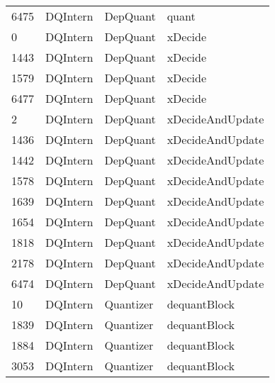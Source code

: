 \begin{tabular}{llll}
6475 &              DQIntern &                   DepQuant &                                     quant \\
0    &              DQIntern &                   DepQuant &                                   xDecide \\
1443 &              DQIntern &                   DepQuant &                                   xDecide \\
1579 &              DQIntern &                   DepQuant &                                   xDecide \\
6477 &              DQIntern &                   DepQuant &                                   xDecide \\
2    &              DQIntern &                   DepQuant &                          xDecideAndUpdate \\
1436 &              DQIntern &                   DepQuant &                          xDecideAndUpdate \\
1442 &              DQIntern &                   DepQuant &                          xDecideAndUpdate \\
1578 &              DQIntern &                   DepQuant &                          xDecideAndUpdate \\
1639 &              DQIntern &                   DepQuant &                          xDecideAndUpdate \\
1654 &              DQIntern &                   DepQuant &                          xDecideAndUpdate \\
1818 &              DQIntern &                   DepQuant &                          xDecideAndUpdate \\
2178 &              DQIntern &                   DepQuant &                          xDecideAndUpdate \\
6474 &              DQIntern &                   DepQuant &                          xDecideAndUpdate \\
10   &              DQIntern &                  Quantizer &                              dequantBlock \\
1839 &              DQIntern &                  Quantizer &                              dequantBlock \\
1884 &              DQIntern &                  Quantizer &                              dequantBlock \\
3053 &              DQIntern &                  Quantizer &                              dequantBlock \\

\end{tabular}
